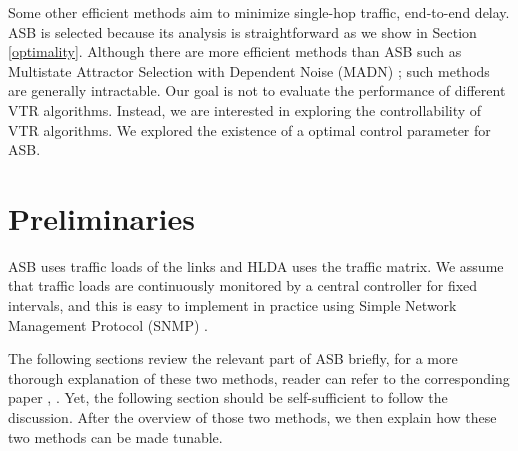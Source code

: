 \documentclass[conference]{IEEEtran}
\begin{document}
Some other efficient methods aim to minimize single-hop traffic, end-to-end delay.
ASB is selected because its analysis is straightforward as we show in Section \ref{optimality}.
Although there are more efficient methods than ASB such as Multistate Attractor Selection with Dependent Noise (MADN) \cite{Hanay:VTCM13,Hanay:NTS14};
such methods are generally intractable. Our goal is not to evaluate the performance of different VTR algorithms. 
Instead, we are interested in exploring the controllability of VTR algorithms.
We explored the existence of a optimal control parameter for ASB.


 
\section{Preliminaries}\label{background}
ASB uses traffic loads of the links and HLDA uses the traffic matrix.
We assume that traffic loads are continuously monitored by a central controller for fixed intervals, 
and this is easy to implement in practice using Simple Network Management Protocol (SNMP) \cite{Wu:ASWN11}.


The following sections review the relevant part of ASB briefly, for a more thorough explanation of these two methods, reader can refer to
the corresponding paper \cite{Koizumi:10}, \cite{Ramaswami:DLTW96}. Yet, the following section should be self-sufficient to follow the discussion. 
After the overview of those two methods, 
we then explain how these two methods can be made tunable.  
\end{document}
